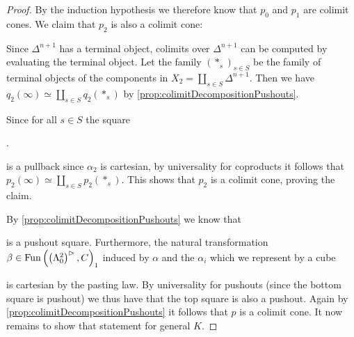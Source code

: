 \begin{lemma}
\begin{proof}
        By the induction hypothesis we therefore know that $p_0$ and $p_1$ are colimit cones. 
        We claim that $p_2$ is also a colimit cone:
        
        Since $\Delta^{n+1}$ has a terminal object, colimits over $\Delta^{n+1}$ can be computed by evaluating the terminal object.
        Let the family $(*_s)_{s\in S}$ be the family of terminal objects of the components in $X_2=\coprod\limits_{s\in S} \Delta^{n+1}$.
        Then we have $q_2(\infty)\simeq\coprod\limits_{s\in S} q_2(*_s)$ by \cref{prop:colimitDecompositionPushouts}.

        Since for all $s\in S$ the square
        \begin{center}
            \;.
        \end{center}
        is a pullback since $\alpha_2$ is cartesian, by universality for coproducts it follows that $p_2(\infty)\simeq\coprod\limits_{s\in S} p_2(*_s)$.
        This shows that $p_2$ is a colimit cone, proving the claim.
        
        By \cref{prop:colimitDecompositionPushouts} we know that 
        \begin{center}
        \end{center}
        is a pushout square.
        Furthermore, the natural transformation $\beta\in\operatorname{Fun}\left(\left(\Lambda_0^2\right)^{\rhd},C\right)_1$ induced by $\alpha$ and the $\alpha_i$ which we represent by a cube
        \begin{center}
        \end{center}
        is cartesian by the pasting law.
        By universality for pushouts (since the bottom square is pushout) we thus have that the top square is also a pushout.
        Again by \cref{prop:colimitDecompositionPushouts} it follows that $p$ is a colimit cone.
        It now remains to show that statement for general $K$.


\end{proof}
\end{lemma}
